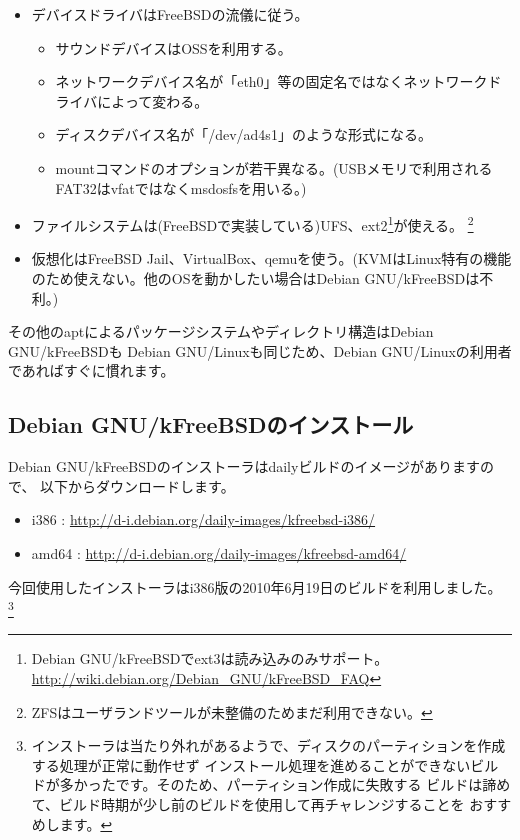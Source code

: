 \documentclass[mingoth,a4paper]{jsarticle}
\begin{document}
\begin{itemize}
 \item デバイスドライバはFreeBSDの流儀に従う。
 \begin{itemize}
  \item サウンドデバイスはOSSを利用する。
  \item ネットワークデバイス名が「eth0」等の固定名ではなくネットワークドライバによって変わる。
  \item ディスクデバイス名が「/dev/ad4s1」のような形式になる。
  \item mountコマンドのオプションが若干異なる。(USBメモリで利用されるFAT32はvfatではなくmsdosfsを用いる。)
 \end{itemize}
 \item ファイルシステムは(FreeBSDで実装している)UFS、ext2\footnote{Debian GNU/kFreeBSDでext3は読み込みのみサポート。\url{http://wiki.debian.org/Debian_GNU/kFreeBSD_FAQ}}が使える。
\footnote{ZFSはユーザランドツールが未整備のためまだ利用できない。}
 \item 仮想化はFreeBSD Jail、VirtualBox、qemuを使う。(KVMはLinux特有の機能のため使えない。他のOSを動かしたい場合はDebian GNU/kFreeBSDは不利。)
\end{itemize}

その他のaptによるパッケージシステムやディレクトリ構造はDebian GNU/kFreeBSDも
Debian GNU/Linuxも同じため、Debian GNU/Linuxの利用者であればすぐに慣れます。

\subsection{Debian GNU/kFreeBSDのインストール}

Debian GNU/kFreeBSDのインストーラはdailyビルドのイメージがありますので、
以下からダウンロードします。

\begin{itemize}
 \item i386  : \url{http://d-i.debian.org/daily-images/kfreebsd-i386/}
 \item amd64 : \url{http://d-i.debian.org/daily-images/kfreebsd-amd64/}
\end{itemize}

今回使用したインストーラはi386版の2010年6月19日のビルドを利用しました。
\footnote{インストーラは当たり外れがあるようで、ディスクのパーティションを作成する処理が正常に動作せず
インストール処理を進めることができないビルドが多かったです。そのため、パーティション作成に失敗する
ビルドは諦めて、ビルド時期が少し前のビルドを使用して再チャレンジすることを
おすすめします。}
\end{document}
